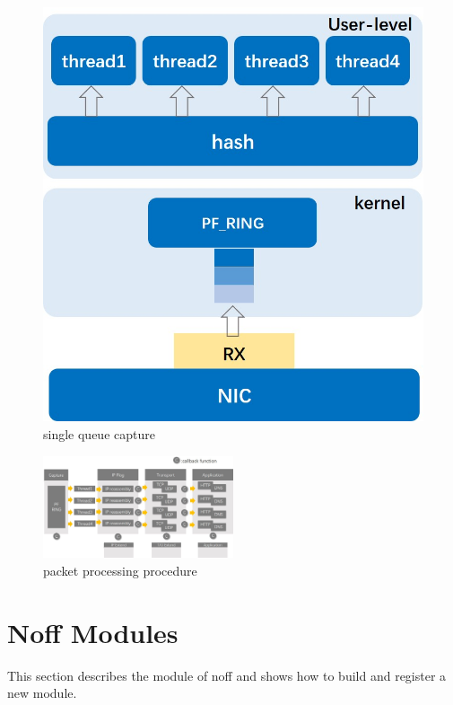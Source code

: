 \documentclass[conference]{IEEEtran}
\begin{document}
\begin{figure}
\begin{minipage}[t]{0.495\linewidth}
\includegraphics[width=\textwidth]{./picture/Figure2.jpg}
\caption{single queue capture}
\label{fig:2}
\end{minipage}
\end{figure} 

\begin{figure}[htbp]
  \centering
  \includegraphics[width=0.5\textwidth]{./picture/Figure3.jpg}
  \caption{packet processing procedure}
  \label{fig:3}
\end{figure}

\section{Noff Modules}
This section describes the module of noff and shows how to build and register a new module.
\end{document}
